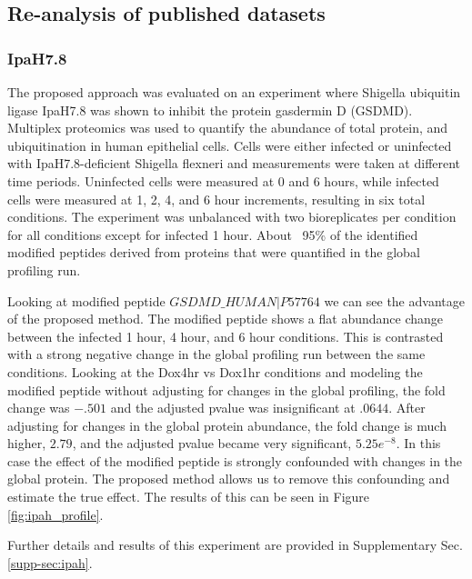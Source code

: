 \documentclass[mcp]{article}
\numberwithin{figure}{section} %
\numberwithin{table}{section}
\begin{document}
\subsection*{Re-analysis of published datasets}

\subsubsection*{IpaH7.8}

The proposed approach was evaluated on an experiment where Shigella ubiquitin ligase IpaH7.8 was shown to inhibit the protein gasdermin D (GSDMD).\cite{LUCHETTI2021} Multiplex proteomics was used to quantify the abundance of total protein, and ubiquitination in human epithelial cells. Cells were either infected or uninfected with IpaH7.8-deficient Shigella flexneri and measurements were taken at different time periods. Uninfected cells were measured at 0 and 6 hours, while infected cells were measured at 1, 2, 4, and 6 hour increments, resulting in six total conditions. The experiment was unbalanced with two bioreplicates per condition for all conditions except for infected 1 hour. About ~95\% of the identified modified peptides derived from proteins that were quantified in the global profiling run.

Looking at modified peptide $GSDMD\_HUMAN|P57764$ we can see the advantage of the proposed method. The modified peptide shows a flat abundance change between the infected 1 hour, 4 hour, and 6 hour conditions. This is contrasted with a strong negative change in the global profiling run between the same conditions. Looking at the Dox4hr vs Dox1hr conditions and modeling the modified peptide without adjusting for changes in the global profiling, the fold change was $-.501$ and the adjusted pvalue was insignificant at $.0644$. After adjusting for changes in the global protein abundance, the fold change is much higher, $2.79$, and the adjusted pvalue became very significant, $5.25e^{-8}$. In this case the effect of the modified peptide is strongly confounded with changes in the global protein. The proposed method allows us to remove this confounding and estimate the true effect. The results of this can be seen in Figure \ref{fig:ipah_profile}. 

Further details and results of this experiment are provided in Supplementary Sec. \ref{supp-sec:ipah}. 
\end{document}
